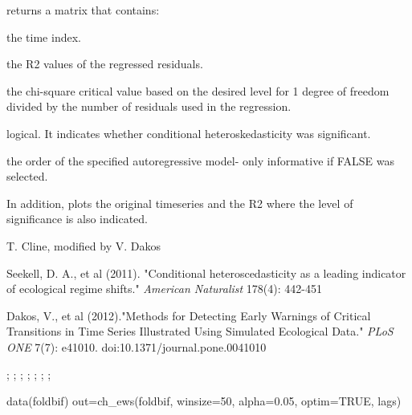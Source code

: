 \documentclass[a4paper]{book}
\begin{document}
%
\begin{Value}
 returns a matrix that contains:

\begin{ldescription}
\item[\code{time}] the time index.

\item[\code{r.squared}] the R2 values of the regressed
residuals.

\item[\code{critical.value}] the chi-square critical value based
on the desired  level for 1 degree of freedom
divided by the number of residuals used in the
regression.

\item[\code{test.result}] logical. It indicates whether
conditional heteroskedasticity was significant.

\item[\code{ar.fit.order}] the order of the specified
autoregressive model- only informative if 
FALSE was selected.

\end{ldescription}
In addition,  plots the original timeseries
and the R2 where the level of significance is also
indicated.
\end{Value}
%
\begin{Author}\relax
T. Cline, modified by V. Dakos
\end{Author}
%
\begin{References}\relax
Seekell, D. A., et al (2011). "Conditional
heteroscedasticity as a leading indicator of ecological
regime shifts." \emph{American Naturalist} 178(4):
442-451

Dakos, V., et al (2012)."Methods for Detecting Early
Warnings of Critical Transitions in Time Series
Illustrated Using Simulated Ecological Data." \emph{PLoS
ONE} 7(7): e41010. doi:10.1371/journal.pone.0041010
\end{References}
%
\begin{SeeAlso}\relax
{}; ;
; ;
; ;
; 
\end{SeeAlso}
%
\begin{Examples}
\begin{ExampleCode}
data(foldbif)
out=ch_ews(foldbif, winsize=50, alpha=0.05, optim=TRUE, lags)
\end{ExampleCode}
\end{Examples}
\end{document}
